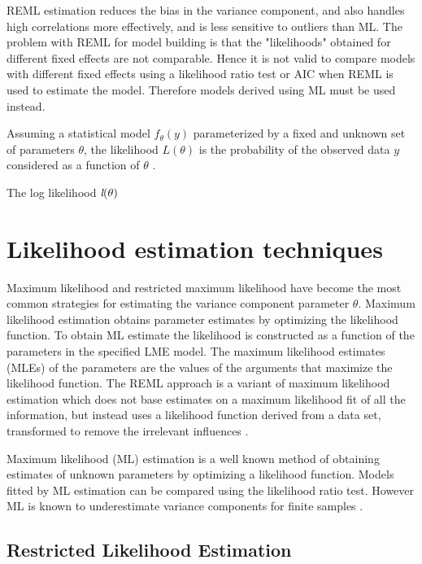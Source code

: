 \documentclass[12pt, a4paper]{report}
\theoremstyle{plain}
\theoremstyle{definition}
\theoremstyle{remark}
\begin{document}
REML estimation reduces the bias in the variance component, and also handles high correlations
more effectively, and is less sensitive to outliers than ML.  The problem with REML for model building is that the "likelihoods" obtained for different fixed effects are not comparable. Hence it is not valid to compare models
with different fixed effects using a likelihood ratio test or AIC when REML is used to
estimate the model. Therefore models derived using ML must be used instead.





Assuming a statistical model $f_{\theta}(y)$ parameterized by a fixed and unknown set of parameters $\theta$, the likelihood $L(\theta)$ is the probability of the observed data $y$ considered as a function of $\theta$ \citep{youngjo}.

The log likelihood $\emph{l}(\theta)$






\section{Likelihood estimation techniques}
Maximum likelihood and restricted maximum likelihood have become the most common strategies for estimating the variance component parameter $\theta.$ Maximum likelihood estimation obtains
parameter estimates by optimizing the likelihood function. To obtain ML estimate the likelihood is constructed as a function of the parameters in the specified LME model. The maximum likelihood estimates (MLEs) of the parameters are the values of the arguments that maximize the likelihood function. The REML approach is a variant of maximum likelihood estimation which does not base estimates on a maximum likelihood fit of all the information, but instead uses a likelihood function derived from a data set, transformed to remove the irrelevant influences \citep{REMLDefine}.

Maximum likelihood (ML) estimation is a well known method of
obtaining estimates of unknown parameters by optimizing a
likelihood function. Models fitted by ML estimation can be
compared using the likelihood ratio test. However ML is known to
underestimate variance components for finite samples \citep{Demi}.

\subsection{Restricted Likelihood Estimation}
\end{document}
